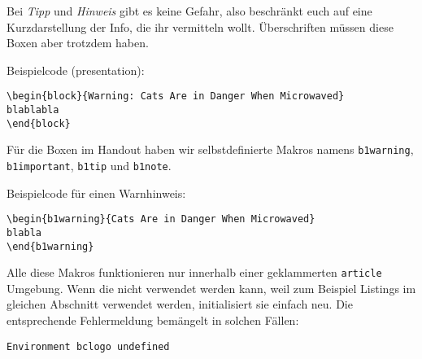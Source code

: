 \begin{frame}[fragile]
Bei \textit{Tipp} und \textit{Hinweis} gibt es keine Gefahr, also beschränkt euch auf eine Kurzdarstellung der Info, die ihr vermitteln wollt. Überschriften müssen diese Boxen aber trotzdem haben.

Beispielcode (presentation):
\begin{lstlisting}
\begin{block}{Warning: Cats Are in Danger When Microwaved}
blablabla
\end{block}
\end{lstlisting}

Für die Boxen im Handout haben wir selbstdefinierte Makros namens \texttt{b1warning}, \texttt{b1important}, \texttt{b1tip} und \texttt{b1note}.

Beispielcode für einen Warnhinweis:
\begin{lstlisting}
\begin{b1warning}{Cats Are in Danger When Microwaved}
blabla
\end{b1warning}
\end{lstlisting}
 
Alle diese Makros funktionieren nur innerhalb einer geklammerten \texttt{article} Umgebung. Wenn die nicht verwendet werden kann, weil zum Beispiel Listings im gleichen Abschnitt verwendet werden, initialisiert sie einfach neu. Die entsprechende Fehlermeldung bemängelt in solchen Fällen:

\begin{lstlisting}
Environment bclogo undefined 
\end{lstlisting}


\end{frame}

